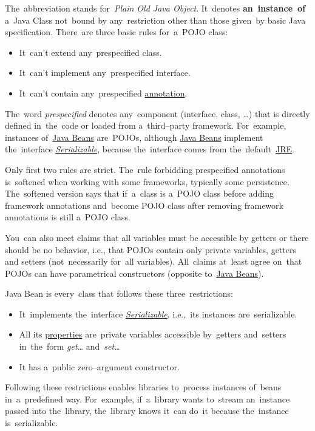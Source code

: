 \label{pojo}
The~abbreviation stands for~\textit{Plain Old Java Object}. It~denotes \textbf{an~instance~of} a~Java Class not~bound by any~restriction other than those given~by basic Java specification. There~are three basic rules for~a~POJO class:
\begin{itemize}
    \item It~can't extend any~prespecified class.
    \item It~can't implement any~prespecified interface.
    \item It~can't contain any~prespecified \hyperref[javaannotation]{annotation}.
\end{itemize}
\noindent The~word \textit{prespecified} denotes any~component (interface, class, \dots) that is directly defined in~the~code or loaded from a~third--party framework. For~example, instances of~\hyperref[javabeans]{Java Beans} are~POJOs, although \hyperref[javabeans]{Java Beans} implement the~interface \hyperref[serialization]{\textit{Serializable}}, because the~interface comes from the~default~\hyperref[jdkjrejvm]{JRE}.

\warning Only first two rules are strict. The~rule forbidding prespecified annotations is~softened when working with some frameworks, typically some persistence. The~softened version says that if~a~class is a~POJO class before adding framework annotations and~become POJO class after removing framework annotations is still a~POJO class.

\warning You~can also meet claims that all variables must be accessible by getters or there should be no behavior, i.e., that POJOs contain only private variables, getters and setters (not~necessarily for~all variables). All~claims at~least agree on~that POJOs can have parametrical constructors (opposite to~\hyperref[javabeans]{Java Beans}).

\label{javabeans}
Java Bean is every~class that follows these three~restrictions:
\begin{itemize}
    \item It~implements the~interface \hyperref[serialization]{\textit{Serializable}}, i.e.,~its instances are~serializable.
    \item All its \hyperref[variablefieldproperty]{properties} are~private variables accessible by~getters and~setters in~the~form \textit{get\dots} and~\textit{set\dots}
    \item It has a~public zero--argument constructor.
\end{itemize}
\noindent Following these restrictions enables libraries to~process instances of~beans in~a~predefined way. For~example, if~a~library wants to~stream an~instance passed into the~library, the~library knows it~can do~it because the~instance is~serializable.

